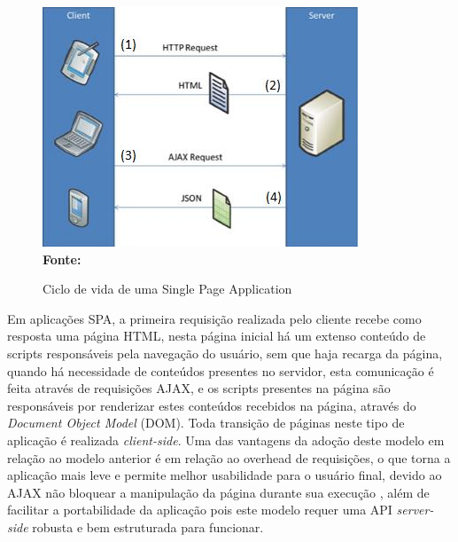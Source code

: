 \begin{figure}[!ht]
	\centering	
	\caption[\hspace{0.1cm} Ciclo de vida de uma Single Page Application.]{Ciclo de vida de uma Single Page Application}
	  \vspace{-0.4cm}
	\includegraphics[width=.8\textwidth]{figuras/spa.png}
	 \vspace{-0.3cm}
	\\\textbf{\footnotesize Fonte: \cite{spa02}}
	\label{fig:spa}
\end{figure}

Em aplicações SPA, a primeira requisição realizada pelo cliente recebe como resposta uma página HTML, nesta página inicial há um extenso conteúdo de
scripts responsáveis pela navegação do usuário, sem que haja recarga da página, quando há necessidade de conteúdos presentes no servidor, esta 
comunicação é feita através de requisições AJAX, e os scripts presentes na página são responsáveis por renderizar estes conteúdos recebidos na página,
através do \textit{Document Object Model} (DOM). Toda transição de páginas neste tipo de aplicação é realizada \textit{client-side}. Uma das vantagens
da adoção deste modelo em relação ao modelo anterior é em relação ao overhead de requisições, o que torna a aplicação mais leve e permite melhor 
usabilidade para o usuário final, devido ao AJAX não bloquear a manipulação da página durante sua execução \cite{spa01}, além de facilitar a 
portabilidade da aplicação pois este modelo requer uma API \textit{server-side} robusta e bem estruturada para funcionar.
